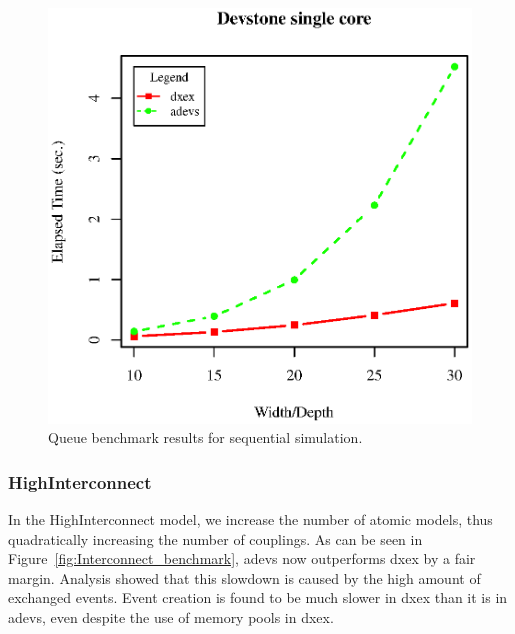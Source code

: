 \begin{figure}
	\includegraphics[width=\columnwidth]{fig/fig1.eps}
	\caption{Queue benchmark results for sequential simulation.}
	\label{fig:Queue_benchmark}
\end{figure}

\subsubsection{HighInterconnect}
In the HighInterconnect model, we increase the number of atomic models, thus quadratically increasing the number of couplings.
As can be seen in Figure~\ref{fig:Interconnect_benchmark}, adevs now outperforms dxex by a fair margin.
Analysis showed that this slowdown is caused by the high amount of exchanged events.
Event creation is found to be much slower in dxex than it is in adevs, even despite the use of memory pools in dxex.

